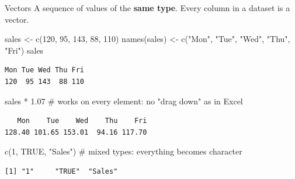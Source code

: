 \documentclass[
  ignorenonframetext,
  aspectratio=169,
]{beamer}
\newenvironment{Shaded}{\begin{snugshade}}{\end{snugshade}}
\newcommand{\CommentTok}[1]{\textcolor[rgb]{0.37,0.37,0.37}{#1}}
\newcommand{\ConstantTok}[1]{\textcolor[rgb]{0.56,0.35,0.01}{#1}}
\newcommand{\DecValTok}[1]{\textcolor[rgb]{0.68,0.00,0.00}{#1}}
\newcommand{\FloatTok}[1]{\textcolor[rgb]{0.68,0.00,0.00}{#1}}
\newcommand{\FunctionTok}[1]{\textcolor[rgb]{0.28,0.35,0.67}{#1}}
\newcommand{\NormalTok}[1]{\textcolor[rgb]{0.00,0.23,0.31}{#1}}
\newcommand{\OtherTok}[1]{\textcolor[rgb]{0.00,0.23,0.31}{#1}}
\newcommand{\SpecialCharTok}[1]{\textcolor[rgb]{0.37,0.37,0.37}{#1}}
\newcommand{\StringTok}[1]{\textcolor[rgb]{0.13,0.47,0.30}{#1}}
\begin{document}
\begin{frame}[fragile]{Vectors}
\protect\hypertarget{vectors}{}
A sequence of values of the \textbf{same type}. Every column in a
dataset is a vector.

\begin{Shaded}
\begin{Highlighting}[]
\NormalTok{sales }\OtherTok{\textless{}{-}} \FunctionTok{c}\NormalTok{(}\DecValTok{120}\NormalTok{, }\DecValTok{95}\NormalTok{, }\DecValTok{143}\NormalTok{, }\DecValTok{88}\NormalTok{, }\DecValTok{110}\NormalTok{)}
\FunctionTok{names}\NormalTok{(sales) }\OtherTok{\textless{}{-}} \FunctionTok{c}\NormalTok{(}\StringTok{"Mon"}\NormalTok{, }\StringTok{"Tue"}\NormalTok{, }\StringTok{"Wed"}\NormalTok{, }\StringTok{"Thu"}\NormalTok{, }\StringTok{"Fri"}\NormalTok{)}
\NormalTok{sales}
\end{Highlighting}
\end{Shaded}

\begingroup\tiny\color{darkgray}

\begin{verbatim}
Mon Tue Wed Thu Fri 
120  95 143  88 110 
\end{verbatim}

\endgroup

\begin{Shaded}
\begin{Highlighting}[]
\NormalTok{sales }\SpecialCharTok{*} \FloatTok{1.07}             \CommentTok{\# works on every element: no "drag down" as in Excel}
\end{Highlighting}
\end{Shaded}

\begingroup\tiny\color{darkgray}

\begin{verbatim}
   Mon    Tue    Wed    Thu    Fri 
128.40 101.65 153.01  94.16 117.70 
\end{verbatim}

\endgroup

\begin{Shaded}
\begin{Highlighting}[]
\FunctionTok{c}\NormalTok{(}\DecValTok{1}\NormalTok{, }\ConstantTok{TRUE}\NormalTok{, }\StringTok{"Sales"}\NormalTok{)      }\CommentTok{\# mixed types: everything becomes character}
\end{Highlighting}
\end{Shaded}

\begingroup\tiny\color{darkgray}

\begin{verbatim}
[1] "1"     "TRUE"  "Sales"
\end{verbatim}

\endgroup
\end{frame}
\end{document}
